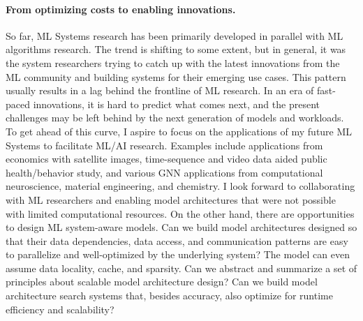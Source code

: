 \documentclass[letterpaper]{article}
\begin{document}
\paragraph{From optimizing costs to enabling innovations.}So far, ML Systems research has been primarily developed in parallel with ML algorithms research. The trend is shifting to some extent, but in general, it was the system researchers trying to catch up with the latest innovations from the ML community and building systems for their emerging use cases. This pattern usually results in a lag behind the frontline of ML research. In an era of fast-paced innovations, it is hard to predict what comes next, and the present challenges may be left behind by the next generation of models and workloads. To get ahead of this curve, I aspire to focus on the applications of my future ML Systems to facilitate ML/AI research. Examples include applications from economics with satellite images, time-sequence and video data aided public health/behavior study, and various GNN applications from computational neuroscience, material engineering, and chemistry. I look forward to collaborating with ML researchers and enabling model architectures that were not possible with limited computational resources. On the other hand, there are opportunities to design ML system-aware models. Can we build model architectures designed so that their data dependencies, data access, and communication patterns are easy to parallelize and well-optimized by the underlying system? The model can even assume data locality, cache, and sparsity. Can we abstract and summarize a set of principles about scalable model architecture design? Can we build model architecture search systems that, besides accuracy, also optimize for runtime efficiency and scalability?










\end{document}
